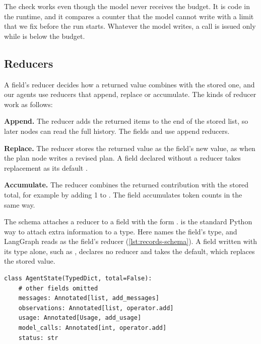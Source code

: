 The check works even though the model never receives the budget. It is code in the runtime, and it
compares a counter that the model cannot write with a limit that we fix before the run starts.
Whatever the model writes, a call is issued only while  is below the budget.

\subsection{Reducers}
\label{sec:records-reducers}

A field's reducer decides how a returned value combines with the stored one, and our agents use
reducers that append, replace or accumulate. The kinds of reducer work as follows:
\bi
\item \textbf{Append.} The reducer adds the returned items to the end of the stored list, so later
nodes can read the full history. The fields  and  use append
reducers.
\item \textbf{Replace.} The reducer stores the returned value as the field's new value, as when the
plan node writes a revised plan. A field declared without a reducer takes replacement as its default
\citep{langgraph-graph-api}.
\item \textbf{Accumulate.} The reducer combines the returned contribution with the stored total, for
example by adding 1 to . The field  accumulates token counts in
the same way.
\ei

The schema attaches a reducer to a field with the form .
 is the standard Python way to attach extra information to a type. Here
 names the field's type, and LangGraph reads  as the field's reducer
(\cref{lst:records-schema}). A field written with its type alone, such as ,
declares no reducer and takes the default, which replaces the stored value.

\noindent\begin{minipage}{\linewidth}
\begin{lstlisting}[basicstyle=\ttfamily\footnotesize, caption={Illustrative code for part of the
state schema, with the reducer of each field.}, label=lst:records-schema]
class AgentState(TypedDict, total=False):
    # other fields omitted
    messages: Annotated[list, add_messages]
    observations: Annotated[list, operator.add]
    usage: Annotated[Usage, add_usage]
    model_calls: Annotated[int, operator.add]
    status: str
\end{lstlisting}
\end{minipage}

